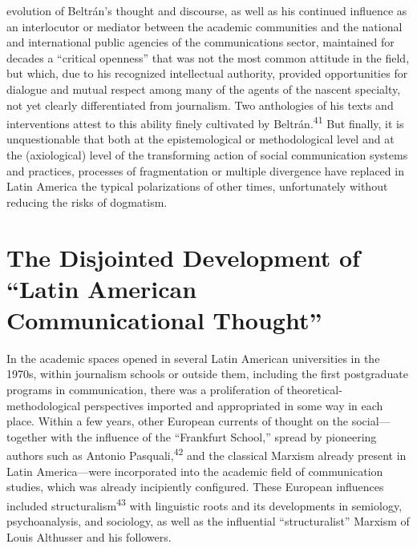 \documentclass{tufte-handout}
\begin{document}
evolution of Beltrán's thought and discourse, as well as his continued
influence as an interlocutor or mediator between the academic
communities and the national and international public agencies of the
communications sector, maintained for decades a ``critical openness''
that was not the most common attitude in the field, but which, due to
his recognized intellectual authority, provided opportunities for
dialogue and mutual respect among many of the agents of the nascent
specialty, not yet clearly differentiated from journalism. Two
anthologies of his texts and interventions attest to this ability finely
cultivated by Beltrán.\textsuperscript{41} But finally, it is unquestionable that both at the
epistemological or methodological level and at the (axiological) level
of the transforming action of social communication systems and
practices, processes of fragmentation or multiple divergence have
replaced in Latin America the typical polarizations of other times,
unfortunately without reducing the risks of dogmatism.

\hypertarget{the-disjointed-development-of-latin-american-communicational-thought}{%
\section{The Disjointed Development of ``Latin American\\\noindent
Communicational
Thought''}\label{the-disjointed-development-of-latin-american-communicational-thought}}

In the academic spaces opened in several Latin American universities in
the 1970s, within journalism schools or outside them, including the
first postgraduate programs in communication, there was a proliferation
of theoretical-methodological perspectives imported and appropriated in
some way in each place. Within a few years, other European currents of
thought on the social---together with the influence of the ``Frankfurt
School,'' spread by pioneering authors such as Antonio
Pasquali,\textsuperscript{42} and the classical Marxism
already present in Latin America---were incorporated into the academic
field of communication studies, which was already incipiently
configured. These European influences included structuralism\textsuperscript{43} with linguistic roots and its
developments in semiology, psychoanalysis, and sociology, as well as the
influential ``structuralist'' Marxism of Louis Althusser and his
followers.
\end{document}

